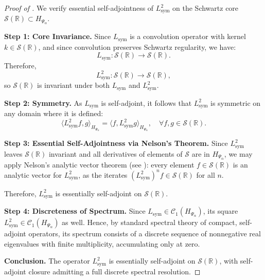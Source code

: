 \begin{proof}[Proof of ]
We verify essential self-adjointness of \( L_{\mathrm{sym}}^2 \) on the Schwartz core \( \mathcal{S}(\mathbb{R}) \subset H_{\Psi_\alpha} \).

\textbf{Step 1: Core Invariance.}
Since \( L_{\mathrm{sym}} \) is a convolution operator with kernel \( k \in \mathcal{S}(\mathbb{R}) \), and since convolution preserves Schwartz regularity, we have:
\[
L_{\mathrm{sym}} \colon \mathcal{S}(\mathbb{R}) \to \mathcal{S}(\mathbb{R}).
\]
Therefore,
\[
L_{\mathrm{sym}}^2 \colon \mathcal{S}(\mathbb{R}) \to \mathcal{S}(\mathbb{R}),
\]
so \( \mathcal{S}(\mathbb{R}) \) is invariant under both \( L_{\mathrm{sym}} \) and \( L_{\mathrm{sym}}^2 \).

\textbf{Step 2: Symmetry.}
As \( L_{\mathrm{sym}} \) is self-adjoint, it follows that \( L_{\mathrm{sym}}^2 \) is symmetric on any domain where it is defined:
\[
\langle L_{\mathrm{sym}}^2 f, g \rangle_{H_{\Psi_\alpha}} = \langle f, L_{\mathrm{sym}}^2 g \rangle_{H_{\Psi_\alpha}}, \quad \forall f, g \in \mathcal{S}(\mathbb{R}).
\]

\textbf{Step 3: Essential Self-Adjointness via Nelson's Theorem.}
Since \( L_{\mathrm{sym}}^2 \) leaves \( \mathcal{S}(\mathbb{R}) \) invariant and all derivatives of elements of \( \mathcal{S} \) are in \( H_{\Psi_\alpha} \), we may apply Nelson’s analytic vector theorem (see \cite[Thm. X.36]{ReedSimon1975II}): every element \( f \in \mathcal{S}(\mathbb{R}) \) is an analytic vector for \( L_{\mathrm{sym}}^2 \), as the iterates \( (L_{\mathrm{sym}}^2)^n f \in \mathcal{S}(\mathbb{R}) \) for all \( n \).

Therefore, \( L_{\mathrm{sym}}^2 \) is essentially self-adjoint on \( \mathcal{S}(\mathbb{R}) \).

\textbf{Step 4: Discreteness of Spectrum.}
Since \( L_{\mathrm{sym}} \in \mathcal{C}_1(H_{\Psi_\alpha}) \), its square \( L_{\mathrm{sym}}^2 \in \mathcal{C}_1(H_{\Psi_\alpha}) \) as well. Hence, by standard spectral theory of compact, self-adjoint operators, its spectrum consists of a discrete sequence of nonnegative real eigenvalues with finite multiplicity, accumulating only at zero.

\textbf{Conclusion.}
The operator \( L_{\mathrm{sym}}^2 \) is essentially self-adjoint on \( \mathcal{S}(\mathbb{R}) \), with self-adjoint closure admitting a full discrete spectral resolution.
\end{proof}
